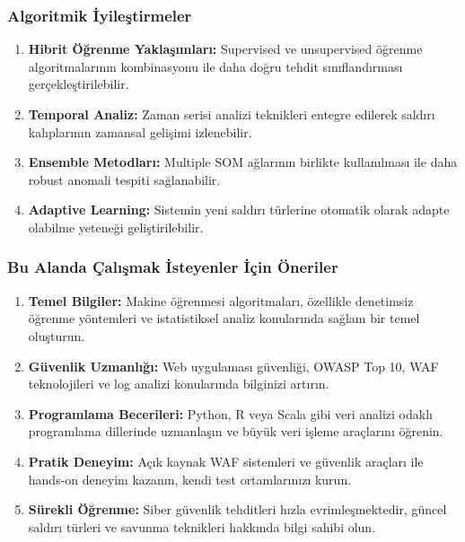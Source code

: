 \subsubsection{Algoritmik İyileştirmeler}

\begin{enumerate}
    \item \textbf{Hibrit Öğrenme Yaklaşımları:} Supervised ve unsupervised öğrenme algoritmalarının kombinasyonu ile daha doğru tehdit sınıflandırması gerçekleştirilebilir.
    
    \item \textbf{Temporal Analiz:} Zaman serisi analizi teknikleri entegre edilerek saldırı kalıplarının zamansal gelişimi izlenebilir.
    
    \item \textbf{Ensemble Metodları:} Multiple SOM ağlarının birlikte kullanılması ile daha robust anomali tespiti sağlanabilir.
    
    \item \textbf{Adaptive Learning:} Sistemin yeni saldırı türlerine otomatik olarak adapte olabilme yeteneği geliştirilebilir.
\end{enumerate}

\subsubsection{Bu Alanda Çalışmak İsteyenler İçin Öneriler}

\begin{enumerate}
    \item \textbf{Temel Bilgiler:} Makine öğrenmesi algoritmaları, özellikle denetimsiz öğrenme yöntemleri ve istatistiksel analiz konularında sağlam bir temel oluşturun.
    
    \item \textbf{Güvenlik Uzmanlığı:} Web uygulaması güvenliği, OWASP Top 10, WAF teknolojileri ve log analizi konularında bilginizi artırın.
    
    \item \textbf{Programlama Becerileri:} Python, R veya Scala gibi veri analizi odaklı programlama dillerinde uzmanlaşın ve büyük veri işleme araçlarını öğrenin.
    
    \item \textbf{Pratik Deneyim:} Açık kaynak WAF sistemleri ve güvenlik araçları ile hands-on deneyim kazanın, kendi test ortamlarınızı kurun.
    
    \item \textbf{Sürekli Öğrenme:} Siber güvenlik tehditleri hızla evrimleşmektedir, güncel saldırı türleri ve savunma teknikleri hakkında bilgi sahibi olun.
\end{enumerate}

